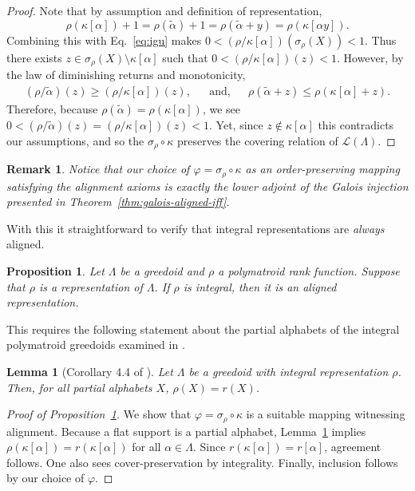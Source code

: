 \documentclass[11pt]{article}
\newtheorem{lemma}[theorem]{Lemma}
\newtheorem{proposition}[theorem]{Proposition}
\newtheorem{remark}[theorem]{Remark}
\newcommand{\glang}{\Lambda}
\providecommand{\L}{}
\renewcommand{\L}{\mathscr{L}}
\begin{document}
\begin{proof}
    Note that by assumption and definition of representation,
    \[
        \rho(\kappa[\alpha]) + 1 = \rho(\widetilde{\alpha}) + 1 = \rho(\widetilde{\alpha} + y) = \rho(\kappa[\alpha y]).
    \]
    Combining this with Eq.~\ref{eq:igu} makes $0< (\rho/\kappa[\alpha])(\sigma_\rho(X)) < 1$.
    Thus there exists $z \in \sigma_\rho(X) \setminus \kappa[\alpha]$ such that $0 < (\rho/\kappa[\alpha])(z) < 1$.
    However, by the law of diminishing returns and monotonicity,
    \begin{align*}
        (\rho/\widetilde{\alpha})(z) \geq (\rho/\kappa[\alpha])(z),&&\text{and,}&&\rho(\widetilde{\alpha} + z) \leq \rho(\kappa[\alpha] + z).
    \end{align*}
    Therefore, because $\rho(\widetilde{\alpha}) = \rho(\kappa[\alpha])$, we see $0< (\rho/\widetilde{\alpha})(z) = (\rho/\kappa[\alpha])(z) < 1$.
    Yet, since $z \notin\kappa[\alpha]$ this contradicts our assumptions, and so the $\sigma_\rho \circ \kappa$ preserves the covering relation of $\L(\glang)$.
\end{proof}
\begin{remark}
    Notice that our choice of $\varphi = \sigma_\rho \circ \kappa$ as an order-preserving mapping satisfying the alignment axioms is exactly the lower adjoint of the Galois injection presented in Theorem~\ref{thm:galois-aligned-iff}.
\end{remark}
With this it straightforward to verify that integral representations are \emph{always} aligned.
\fi

\begin{proposition}\label{prop:int->aligned}
    Let $\glang$ be a greedoid and $\rho$ a polymatroid rank function.
    Suppose that $\rho$ is a representation of $\glang$.
    If $\rho$ is integral, then it is an aligned representation.
\end{proposition}

This requires the following statement about the partial alphabets of the integral polymatroid greedoids examined in \cite{korte1985polymatroid}.

\begin{lemma}[Corollary 4.4 of \cite{korte1985polymatroid}]\label{lem:pa-rank}
    Let $\glang$ be a greedoid with integral representation $\rho$.
    Then, for all partial alphabets $X$, $\rho(X) = r(X)$.
\end{lemma}

\begin{proof}[Proof of Proposition~\ref{prop:int->aligned}]
    We show that $\varphi=\sigma_\rho\circ\kappa$ is a suitable mapping witnessing alignment.
    Because a flat support is a partial alphabet, Lemma~\ref{lem:pa-rank} implies $\rho(\kappa[\alpha])= r(\kappa[\alpha])$ for all $\alpha \in \glang$.
    Since $r(\kappa[\alpha]) = r[\alpha]$, agreement follows.
    One also sees cover-preservation by integrality.
    Finally, inclusion follows by our choice of $\varphi$.
\end{proof}
\end{document}
